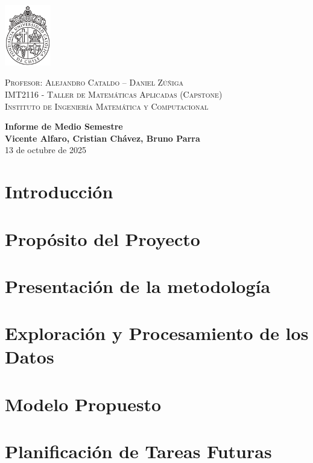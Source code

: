 \documentclass[a4paper, 12pt]{article} %
\numberwithin{figure}{section}
\numberwithin{table}{section}
\newcommand{\departamento}{Instituto de Ingeniería Matemática y Computacional }
\newcommand{\ramo}{Taller de Matemáticas Aplicadas (Capstone) }
\newcommand{\sigla}{IMT2116 }
\newcommand{\titulo}{Informe de Medio Semestre }
\newcommand{\profe}{Alejandro Cataldo -- Daniel Zúñiga }
\newcommand{\nombre}{Vicente Alfaro, Cristian Chávez, Bruno Parra}
\begin{document}
\thispagestyle{empty} %
\begin{minipage}{2cm}
\vspace{-1.5cm}
\includegraphics[width=2cm]{images/logo.pdf}
\vspace{-1.4cm}
\end{minipage}
\begin{minipage}{\linewidth}
\raggedright \footnotesize
\textsc{Profesor: \profe\\
\sigla - \ramo \\
\departamento}
\end{minipage}
\vspace{0.5cm}

\vspace*{8cm}
\begin{center} 
	{\huge \bf \titulo}\\
	\vspace{2mm}
	{\bf \nombre}\\
        \vspace{1mm}
        {13 de octubre de 2025}
\end{center}
\newpage

\section{Introducción}


\section{Propósito del Proyecto}


\section{Presentación de la metodología}


\section{Exploración y Procesamiento de los Datos}


\section{Modelo Propuesto}


\section{Planificación de Tareas Futuras}


\newpage

\end{document}
